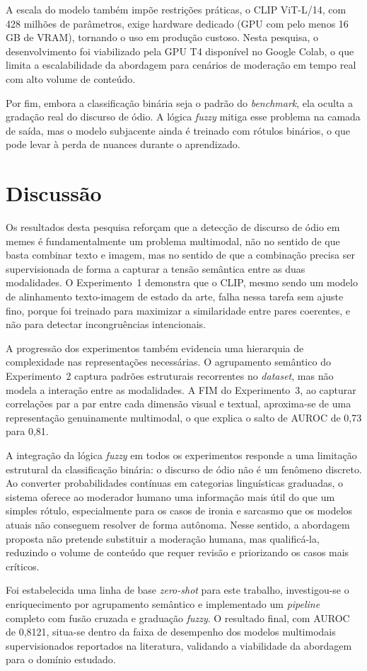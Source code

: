 A escala do modelo também impõe restrições práticas, o CLIP ViT-L/14, com 428 milhões de parâmetros, exige hardware dedicado (GPU com pelo menos 16 GB de VRAM), tornando o uso em produção custoso. Nesta pesquisa, o desenvolvimento foi viabilizado pela GPU T4 disponível no Google Colab, o que limita a escalabilidade da abordagem para cenários de moderação em tempo real com alto volume de conteúdo.

Por fim, embora a classificação binária seja o padrão do \textit{benchmark}, ela oculta a gradação real do discurso de ódio. A lógica \textit{fuzzy} mitiga esse problema na camada de saída, mas o modelo subjacente ainda é treinado com rótulos binários, o que pode levar à perda de nuances durante o aprendizado.

\section{Discussão}

Os resultados desta pesquisa reforçam que a detecção de discurso de ódio em memes é fundamentalmente um problema multimodal, não no sentido de que basta combinar texto e imagem, mas no sentido de que a combinação precisa ser supervisionada de forma a capturar a tensão semântica entre as duas modalidades. O Experimento~1 demonstra que o CLIP, mesmo sendo um modelo de alinhamento texto-imagem de estado da arte, falha nessa tarefa sem ajuste fino, porque foi treinado para maximizar a similaridade entre pares coerentes, e não para detectar incongruências intencionais.

A progressão dos experimentos também evidencia uma hierarquia de complexidade nas representações necessárias. O agrupamento semântico do Experimento~2 captura padrões estruturais recorrentes no \textit{dataset}, mas não modela a interação entre as modalidades. A FIM do Experimento~3, ao capturar correlações par a par entre cada dimensão visual e textual, aproxima-se de uma representação genuinamente multimodal, o que explica o salto de AUROC de 0,73 para 0,81.

A integração da lógica \textit{fuzzy} em todos os experimentos responde a uma limitação estrutural da classificação binária: o discurso de ódio não é um fenômeno discreto. Ao converter probabilidades contínuas em categorias linguísticas graduadas, o sistema oferece ao moderador humano uma informação mais útil do que um simples rótulo, especialmente para os casos de ironia e sarcasmo que os modelos atuais não conseguem resolver de forma autônoma. Nesse sentido, a abordagem proposta não pretende substituir a moderação humana, mas qualificá-la, reduzindo o volume de conteúdo que requer revisão e priorizando os casos mais críticos.

Foi estabelecida uma linha de base \textit{zero-shot} para este trabalho, investigou-se o enriquecimento por agrupamento semântico e implementado um \textit{pipeline} completo com fusão cruzada e graduação \textit{fuzzy}. O resultado final, com AUROC de 0,8121, situa-se dentro da faixa de desempenho dos modelos multimodais supervisionados reportados na literatura, validando a viabilidade da abordagem para o domínio estudado.